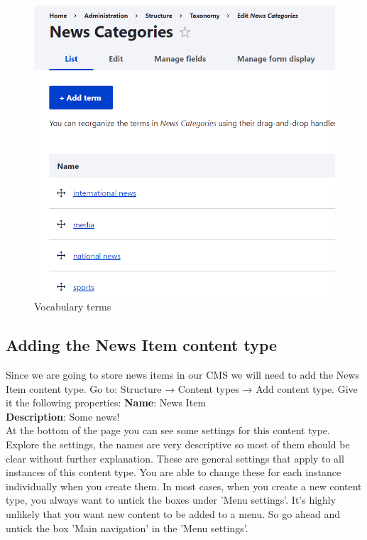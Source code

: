 \begin{figure}[H]
    \centering
    \includegraphics[width=1\linewidth]{img/ch4/admin_taxonomy_list}
    \caption{Vocabulary terms}
    \label{fig:admin_taxonomy_list}
\end{figure}


\subsection{Adding the News Item content type}
Since we are going to store news items in our CMS we will need to add the News Item content type. Go to: Structure → Content types → Add content type.
Give it the following properties:
\textbf{Name}: News Item
\\
\textbf{Description}: Some news!
\\
At the bottom of the page you can see some settings for this content type. Explore the settings, the names are very descriptive so most of them should be clear without further explanation. These are general settings that apply to all instances of this content type. You are able to change these for each instance individually when you create them. In most cases, when you create a new content type, you always want to untick the boxes under 'Menu settings'. It's highly unlikely that you want new content to be added to a menu. 
So go ahead and untick the box 'Main navigation' in the 'Menu settings'. 

